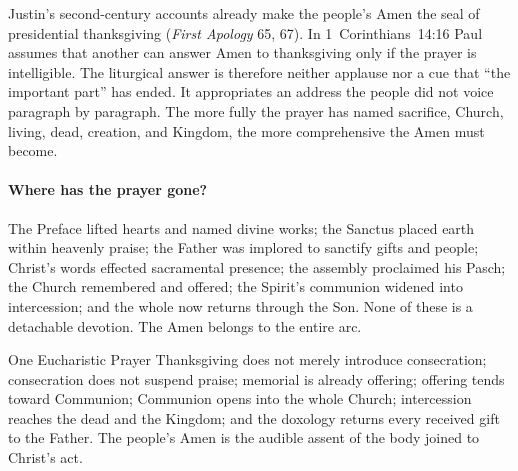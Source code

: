 Justin's second-century accounts already make the people's Amen the seal of presidential thanksgiving (\emph{First Apology} 65, 67). In 1~Corinthians~14:16 Paul assumes that another can answer Amen to thanksgiving only if the prayer is intelligible. The liturgical answer is therefore neither applause nor a cue that ``the important part'' has ended. It appropriates an address the people did not voice paragraph by paragraph. The more fully the prayer has named sacrifice, Church, living, dead, creation, and Kingdom, the more comprehensive the Amen must become.

\paragraph{Where has the prayer gone?}
The Preface lifted hearts and named divine works; the Sanctus placed earth within heavenly praise; the Father was implored to sanctify gifts and people; Christ's words effected sacramental presence; the assembly proclaimed his Pasch; the Church remembered and offered; the Spirit's communion widened into intercession; and the whole now returns through the Son. None of these is a detachable devotion. The Amen belongs to the entire arc.

\begin{massbox}{One Eucharistic Prayer}
Thanksgiving does not merely introduce consecration; consecration does not suspend praise; memorial is already offering; offering tends toward Communion; Communion opens into the whole Church; intercession reaches the dead and the Kingdom; and the doxology returns every received gift to the Father. The people's Amen is the audible assent of the body joined to Christ's act.
\end{massbox}
